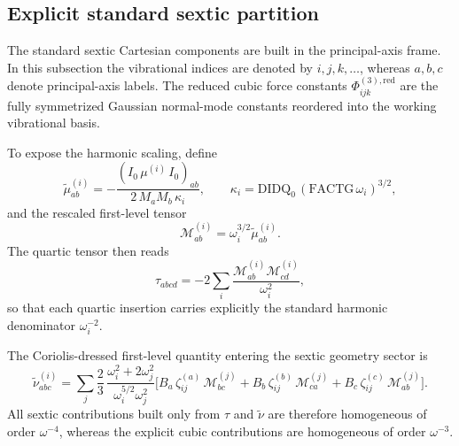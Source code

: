 \subsection{Explicit standard sextic partition}

The standard sextic Cartesian components are built in the principal-axis frame.
In this subsection the vibrational indices are denoted by $i,j,k,\ldots$,
whereas $a,b,c$ denote principal-axis labels. The reduced cubic force constants
$\Phi^{(3),\mathrm{red}}_{ijk}$ are the fully symmetrized Gaussian normal-mode
constants reordered into the working vibrational basis.

To expose the harmonic scaling, define
\begin{equation}
\widetilde{\mu}^{(i)}_{ab}
=
-\frac{(I_0\,\mu^{(i)}\,I_0)_{ab}}
{2\,M_a M_b\,\kappa_i},
\qquad
\kappa_i
=
\mathrm{DIDQ}_0\,(\mathrm{FACTG}\,\omega_i)^{3/2},
\end{equation}
and the rescaled first-level tensor
\begin{equation}
\mathcal{M}^{(i)}_{ab}
=
\omega_i^{3/2}\widetilde{\mu}^{(i)}_{ab}.
\end{equation}
The quartic tensor then reads
\begin{equation}
\tau_{abcd}
=
-2\sum_i
\frac{\mathcal{M}^{(i)}_{ab}\mathcal{M}^{(i)}_{cd}}{\omega_i^2},
\label{eq:app_sextic_tau_from_mu1}
\end{equation}
so that each quartic insertion carries explicitly the standard harmonic
denominator $\omega_i^{-2}$.

The Coriolis-dressed first-level quantity entering the sextic geometry sector
is
\begin{equation}
\widetilde{\nu}^{(i)}_{abc}
=
\sum_j
\frac{2}{3}\,
\frac{\omega_i^2+2\omega_j^2}{\omega_i^{5/2}\omega_j^2}
\Big[
B_a\,\zeta^{(a)}_{ij}\,\mathcal{M}^{(j)}_{bc}
+
B_b\,\zeta^{(b)}_{ij}\,\mathcal{M}^{(j)}_{ca}
+
B_c\,\zeta^{(c)}_{ij}\,\mathcal{M}^{(j)}_{ab}
\Big].
\label{eq:app_sextic_nu_from_mu1}
\end{equation}
All sextic contributions built only from $\tau$ and $\widetilde{\nu}$ are
therefore homogeneous of order $\omega^{-4}$, whereas the explicit cubic
contributions are homogeneous of order $\omega^{-3}$.

